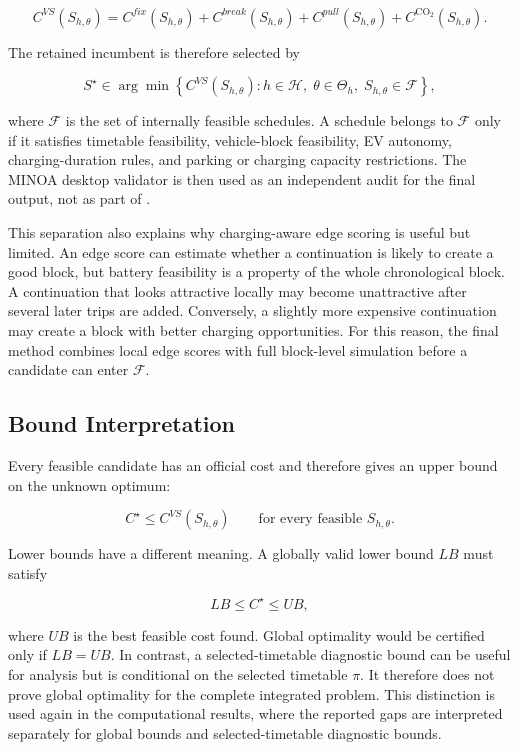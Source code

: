 \begin{equation}
C^{VS}(S_{h,\theta})
=
C^{fix}(S_{h,\theta})
+C^{break}(S_{h,\theta})
+C^{pull}(S_{h,\theta})
+C^{\mathrm{CO}_2}(S_{h,\theta}).
\label{eq:candidate-official-cost}
\end{equation}

The retained incumbent is therefore selected by

\begin{equation}
S^\star
\in
\arg\min
\left\{
C^{VS}(S_{h,\theta}) :
h\in\mathcal{H},\;
\theta\in\Theta_h,\;
S_{h,\theta}\in\mathcal{F}
\right\},
\label{eq:candidate-selection-rule}
\end{equation}

where \(\mathcal{F}\) is the set of internally feasible schedules.  A schedule
belongs to \(\mathcal{F}\) only if it satisfies timetable feasibility,
vehicle-block feasibility, EV autonomy, charging-duration rules, and parking or
charging capacity restrictions.  The MINOA desktop validator is then used as an
independent audit for the final output, not as part of
.

This separation also explains why charging-aware edge scoring is useful but
limited.  An edge score can estimate whether a continuation is likely to create
a good block, but battery feasibility is a property of the whole chronological
block.  A continuation that looks attractive locally may become unattractive
after several later trips are added.  Conversely, a slightly more expensive
continuation may create a block with better charging opportunities.  For this
reason, the final method combines local edge scores with full block-level
simulation before a candidate can enter \(\mathcal{F}\).

\subsection{Bound Interpretation}
\label{subsec:bound-interpretation-model}
\enlargethispage{2\baselineskip}

Every feasible candidate has an official cost and therefore gives an upper
bound on the unknown optimum:

\begin{equation}
C^\star \le C^{VS}(S_{h,\theta})
\qquad
\text{for every feasible } S_{h,\theta}.
\label{eq:upper-bound-from-candidate}
\end{equation}

Lower bounds have a different meaning.  A globally valid lower bound \(LB\)
must satisfy

\begin{equation}
LB \le C^\star \le UB,
\label{eq:global-bound-sandwich}
\end{equation}

where \(UB\) is the best feasible cost found.  Global optimality would be
certified only if \(LB=UB\).  In contrast, a selected-timetable diagnostic bound
can be useful for analysis but is conditional on the selected timetable
\(\pi\).  It therefore does not prove global optimality for the complete
integrated problem.  This distinction is used again in the computational
results, where the reported gaps are interpreted separately for global bounds
and selected-timetable diagnostic bounds.
